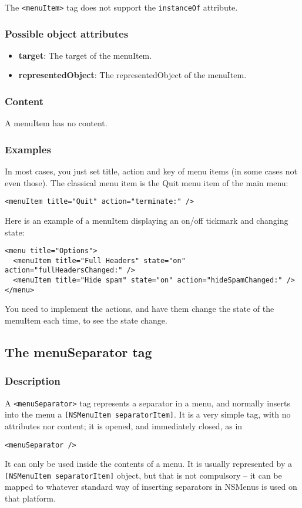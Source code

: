 The \texttt{<menuItem>} tag does not support the \texttt{instanceOf} attribute.

\subsubsection{Possible object attributes}
\begin{itemize}
\item {\bf target}: The target of the menuItem.
\item {\bf representedObject}: The representedObject of the menuItem.
\end{itemize}

\subsubsection{Content}
A menuItem has no content.

\subsubsection{Examples}
In most cases, you just set title, action and key of menu items (in
some cases not even those).  The classical menu item is the Quit menu
item of the main menu:
\begin{verbatim}
<menuItem title="Quit" action="terminate:" />
\end{verbatim}
Here is an example of a menuItem displaying an on/off tickmark and
changing state:
\begin{verbatim}
<menu title="Options">
  <menuItem title="Full Headers" state="on" action="fullHeadersChanged:" />
  <menuItem title="Hide spam" state="on" action="hideSpamChanged:" />
</menu>
\end{verbatim}
You need to implement the actions, and have them change the state of the
menuItem each time, to see the state change.

\subsection{The menuSeparator tag}

\subsubsection{Description}
A \texttt{<menuSeparator>} tag represents a separator in a menu, and
normally inserts into the menu a \texttt{[NSMenuItem separatorItem]}.
It is a very simple tag, with no attributes nor content; it is opened,
and immediately closed, as in
\begin{verbatim}
<menuSeparator />
\end{verbatim}
It can only be used inside the contents of a menu.  It is usually
represented by a \texttt{[NSMenuItem separatorItem]} object, but that
is not compulsory -- it can be mapped to whatever standard way of
inserting separators in NSMenus is used on that platform.

